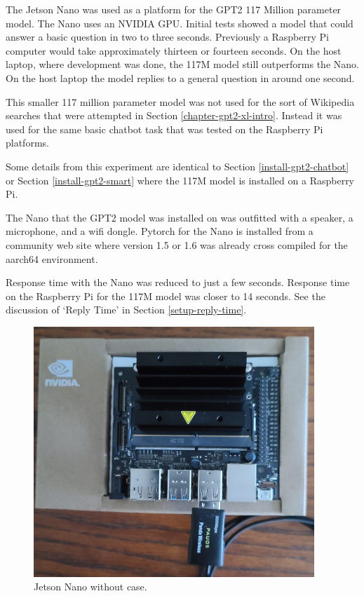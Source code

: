 The Jetson Nano was used as a platform for the GPT2 117 Million parameter model. The Nano uses an NVIDIA GPU. Initial tests showed a model that could answer a basic question in two to three seconds. Previously a Raspberry Pi computer would take approximately thirteen or fourteen seconds. On the host laptop, where development was done, the 117M model still outperforms the Nano. On the host laptop the model replies to a general question in around one second.

This smaller 117 million parameter model was not used for the sort of Wikipedia searches that were attempted in Section \ref{chapter-gpt2-xl-intro}. Instead it was used for the same basic chatbot task that was tested on the Raspberry Pi platforms.

Some details from this experiment are identical to Section \ref{install-gpt2-chatbot} or Section \ref{install-gpt2-smart} where the 117M model is installed on a Raspberry Pi.

The Nano that the GPT2 model was installed on was outfitted with a speaker, a microphone, and a wifi dongle. Pytorch for the Nano is installed from a community web site where version 1.5 or 1.6 was already cross compiled for the aarch64 environment. 

Response time with the Nano was reduced to just a few seconds. Response time on the Raspberry Pi for the 117M model was closer to 14 seconds. See the discussion of `Reply Time' in Section \ref{setup-reply-time}.

\begin{figure}[H]
	\begin{center}
		\includegraphics[scale=0.9]{diagram-jetson-nano-02}
		
		
	\end{center}
	\caption[Jetson Nano]{Jetson Nano without case.}
	
	
\end{figure}